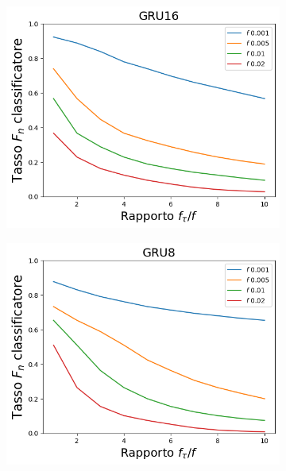 \documentclass[../../main.tex]{subfiles}
\begin{document}
    \begin{figure}[H]
        \centering
        \begin{subfigure}[b]{0.49\textwidth}
            \centering
            \includegraphics[width = \textwidth]{immagini/7/SLBF/GRU16_FNR.png}
            \caption{}
            \label{fig:SLBFFNR_GRU16}
        \end{subfigure}
        \begin{subfigure}[b]{0.49\textwidth}
            \centering
            \includegraphics[width = \textwidth]{immagini/7/SLBF/GRU8_FNR.png}
            \caption{}

\end{subfigure}
\end{figure}
\end{document}
